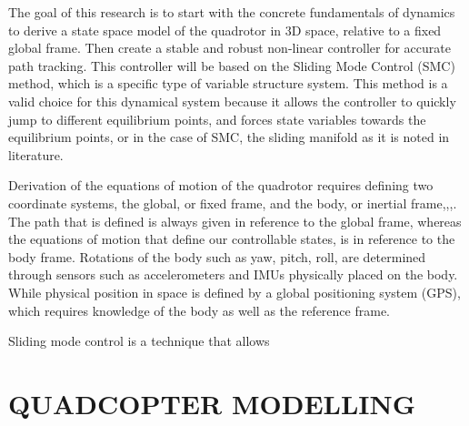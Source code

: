 \documentclass[twocolumn,10pt]{asme2e}
\begin{document}
{The goal of this research is to start with the concrete fundamentals of dynamics to derive a state space model of the quadrotor in 3D space, relative to a fixed global frame. Then create a stable and robust non-linear controller for accurate path tracking. This controller will be based on the Sliding Mode Control (SMC) method, which is a specific type of variable structure system. This method is a valid choice for this dynamical system because it allows the controller to quickly jump to different equilibrium points, and forces state variables towards the equilibrium points, or in the case of SMC, the sliding manifold as it is noted in literature.

Derivation of the equations of motion of the quadrotor requires defining two coordinate systems, the global, or fixed frame, and the body, or inertial frame\cite{FanniMohamed2017AN6Q},\cite{FarameeVeeravat2014EotS},\cite{HaomiaoHuang2009Aaco},\cite{DenisKotarski2016CDFU}. The path that is defined is always given in reference to the global frame, whereas the equations of motion that define our controllable states, is in reference to the body frame. Rotations of the body such as yaw, pitch, roll, are determined through sensors such as accelerometers and IMUs physically placed on the body. While physical position in space is defined by a global positioning system (GPS), which requires knowledge of the body as well as the reference frame.

Sliding mode control is a technique that allows}

\section*{QUADCOPTER MODELLING}
\end{document}
